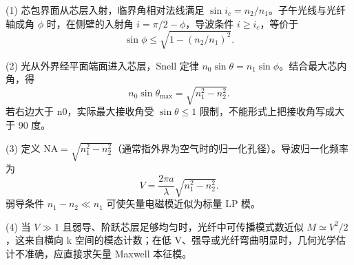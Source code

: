 (1) 芯包界面从芯层入射，临界角相对法线满足 \(\sin i_c=n_2/n_1\)。子午光线与光纤轴成角 \(\phi\) 时，在侧壁的入射角 \(i=\pi/2-\phi\)，导波条件 \(i\ge i_c\)，等价于
\[
\sin\phi\le \sqrt{1-(n_2/n_1)^2}.
\]

(2) 光从外界经平面端面进入芯层，Snell 定律 \(n_0\sin\theta=n_1\sin\phi\)。结合最大芯内角，得
\[
n_0\sin\theta_{\max}=\sqrt{n_1^2-n_2^2}.
\]
若右边大于 n0，实际最大接收角受 \(\sin\theta\le1\) 限制，不能形式上把接收角写成大于 90 度。

(3) 定义 \(\mathrm{NA}=\sqrt{n_1^2-n_2^2}\)（通常指外界为空气时的归一化孔径）。导波归一化频率为
\[
V=\frac{2\pi a}{\lambda}\sqrt{n_1^2-n_2^2}.
\]
弱导条件 \(n_1-n_2\ll n_1\) 可使矢量电磁模近似为标量 LP 模。

(4) 当 \(V\gg 1\) 且弱导、阶跃芯层足够均匀时，光纤中可传播模式数近似 \(M\simeq V^2/2\)，这来自横向 k 空间的模态计数；在低 V、强导或光纤弯曲明显时，几何光学估计不准确，应直接求矢量 Maxwell 本征模。
